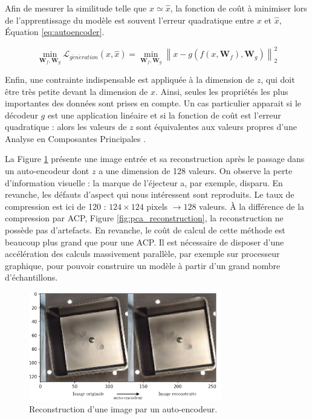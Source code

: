 Afin de mesurer la similitude telle que $x \simeq \hat x$, la fonction de coût à minimiser lors de l'apprentissage du modèle est souvent l'erreur quadratique entre $x$ et $\hat x$, Équation \ref{eq:autoencoder}.

\begin{equation} \label{eq:autoencoder}
\min _{\mathbf{W}_{f}, \mathbf{W}_{g}} \mathcal{L}_{g\acute{e}n\acute{e}ration}\left(x, \hat{x}\right) = \min _{\mathbf{W}_{f}, \mathbf{W}_{g}} \left\|x-g\left(f\left(x, \mathbf{W}_{f}\right), \mathbf{W}_{g}\right)\right\|_{2}^{2}
\end{equation}

Enfin, une contrainte indispensable est appliquée à la dimension de $z$, qui doit être très petite devant la dimension de $x$.
Ainsi, seules les propriétés les plus importantes des données sont prises en compte.
Un cas particulier apparait si le décodeur $g$ est une application linéaire et si la fonction de coût est l'erreur quadratique : alors les valeurs de $z$ sont équivalentes aux valeurs propres d'une Analyse en Composantes Principales \cite{bourlard_autoassociation_1988}.

La Figure \ref{fig:autoencoder} présente une image entrée et sa reconstruction après le passage dans un auto-encodeur dont $z$ a une dimension de 128 valeurs.
On observe la perte d'information visuelle : la marque de l'éjecteur a, par exemple, disparu.
En revanche, les défauts d'aspect qui nous intéressent sont reproduits.
Le taux de compression est ici de 120 : $124 \times 124$ pixels $\rightarrow 128$ valeurs.
À la différence de la compression par ACP, Figure \ref{fig:pca_reconstruction}, la reconstruction ne possède pas d'artefacts.
En revanche, le coût de calcul de cette méthode est beaucoup plus grand que pour une ACP.
Il est nécessaire de disposer d'une accélération des calculs massivement parallèle, par exemple sur processeur graphique, pour pouvoir construire un modèle à partir d'un grand nombre d'échantillons.

\begin{figure}[hbtp]
	\centering
	\includegraphics[width=0.75\textwidth,height=\textheight,keepaspectratio]{../Chap4/Figures/visualize_reconstructed_variations.png}
	\caption{Reconstruction d'une image par un auto-encodeur.}
	\label{fig:autoencoder}
\end{figure}

